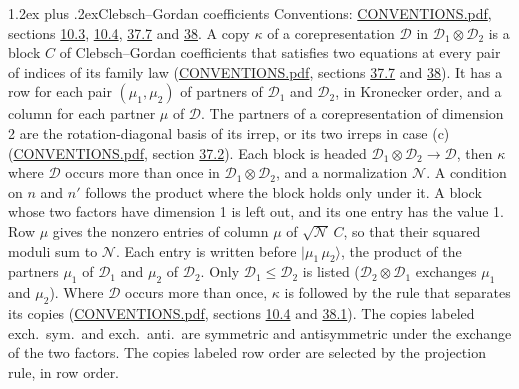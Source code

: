 \documentclass[10pt,a4paper]{article}
\makeatletter
\renewcommand\section{\@startsection{section}{1}{\z@}{-3ex plus -1ex minus -.2ex}%
  {1.2ex plus .2ex}{\normalfont\large\sffamily\bfseries\color{parttitle}}}
\numberwithin{equation}{section}
\newcommand{\irrprod}{\otimes}
\newcommand{\mult}{\kappa}
\newcommand{\intx}{\mu}
\newcommand{\cgnorm}{\mathcal{N}}
\newcommand{\prodket}[2]{\lvert {#1}\,{#2}\rangle}
\makeatother
\begin{document}
\section{Clebsch--Gordan coefficients}\label{s:clebsch_gordan}
Conventions: \href{../../CONVENTIONS.pdf}{CONVENTIONS.pdf}, sections \href{../../../rotation/CONVENTIONS.pdf\#conv.10.3}{10.3}, \href{../../../rotation/CONVENTIONS.pdf\#conv.10.4}{10.4}, \href{../../CONVENTIONS.pdf\#conv.37.7}{37.7} and \href{../../CONVENTIONS.pdf\#conv.38}{38}.
\leavevmode\label{n:matrix.corep.factors}\label{n:index.copy}\label{n:matrix.cg.stored}A copy $\mult$ of a corepresentation $\mathcal{D}$ in $\mathcal{D}_1\irrprod\mathcal{D}_2$ is a block $C$ of Clebsch--Gordan coefficients that satisfies two equations at every pair of indices of its family law (\href{../../CONVENTIONS.pdf}{CONVENTIONS.pdf}, sections \href{../../CONVENTIONS.pdf\#conv.37.7}{37.7} and \href{../../CONVENTIONS.pdf\#conv.38}{38}). \label{n:index.cg}It has a row for each pair $(\intx_1, \intx_2)$ of partners of $\mathcal{D}_1$ and $\mathcal{D}_2$, in Kronecker order, and a column for each partner $\intx$ of $\mathcal{D}$.
The partners of a corepresentation of dimension 2 are the rotation-diagonal basis of its irrep, or its two irreps in case (c) (\href{../../CONVENTIONS.pdf}{CONVENTIONS.pdf}, section \href{../../CONVENTIONS.pdf\#conv.37.2}{37.2}).
Each block is headed $\mathcal{D}_1\irrprod\mathcal{D}_2\to\mathcal{D}$, then $\mult$ where $\mathcal{D}$ occurs more than once in $\mathcal{D}_1\irrprod\mathcal{D}_2$, and a normalization $\cgnorm$. A condition on $n$ and $n'$ follows the product where the block holds only under it. A block whose two factors have dimension 1 is left out, and its one entry has the value 1. Row $\intx$ gives the nonzero entries of column $\intx$ of $\sqrt{\cgnorm}\,C$, so that their squared moduli sum to $\cgnorm$. \label{n:vector.ket.product}Each entry is written before $\prodket{\intx_1}{\intx_2}$, the product of the partners $\intx_1$ of $\mathcal{D}_1$ and $\intx_2$ of $\mathcal{D}_2$. Only $\mathcal{D}_1 \le \mathcal{D}_2$ is listed ($\mathcal{D}_2\irrprod\mathcal{D}_1$ exchanges $\intx_1$ and $\intx_2$).
Where $\mathcal{D}$ occurs more than once, $\mult$ is followed by the rule that separates its copies (\href{../../CONVENTIONS.pdf}{CONVENTIONS.pdf}, sections \href{../../../rotation/CONVENTIONS.pdf\#conv.10.4}{10.4} and \href{../../CONVENTIONS.pdf\#conv.38.1}{38.1}). \label{n:abbreviation.exchange}The copies labeled exch.\ sym.\ and exch.\ anti.\ are symmetric and antisymmetric under the exchange of the two factors. The copies labeled row order are selected by the projection rule, in row order.
\end{document}
